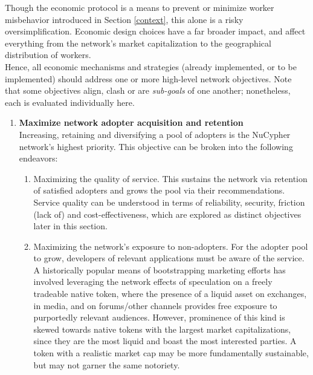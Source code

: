 \documentclass[11pt]{amsart}
\begin{document}
Though the economic protocol is a means to prevent or minimize worker misbehavior introduced in Section \ref{context}, this alone is a risky oversimplification. Economic design choices have a far broader impact, and affect everything from the network's market capitalization to the geographical distribution of workers.
\\
Hence, all economic mechanisms and strategies (already implemented, or to be implemented) should address one or more high-level network objectives. Note that some objectives align, clash or are \textit{sub-goals} of one another; nonetheless, each is evaluated individually here.
\\
\begin{enumerate}
   \item \textbf{Maximize network adopter acquisition and retention}\label{adoption}
   \\
   Increasing, retaining and diversifying a pool of adopters is the NuCypher network's highest priority. This objective can be broken into the following endeavors: 
   \begin{enumerate}
   \item Maximizing the quality of service. This sustains the network via retention of satisfied adopters and grows the pool via their recommendations. Service quality can be understood in terms of reliability, security, friction (lack of) and cost-effectiveness, which are explored as distinct objectives later in this section. 
   \item Maximizing the network's exposure to non-adopters. For the adopter pool to grow, developers of relevant applications must be aware of the service. A historically popular means of bootstrapping marketing efforts has involved leveraging the network effects of speculation on a freely tradeable native token, where the presence of a liquid asset on exchanges, in media, and on forums/other channels provides free exposure to purportedly relevant audiences. However, prominence of this kind is skewed towards native tokens with the largest market capitalizations, since they are the most liquid and boast the most interested parties. A token with a realistic market cap may be more fundamentally sustainable, but may not garner the same notoriety. 

\end{enumerate}
\end{enumerate}
\end{document}
